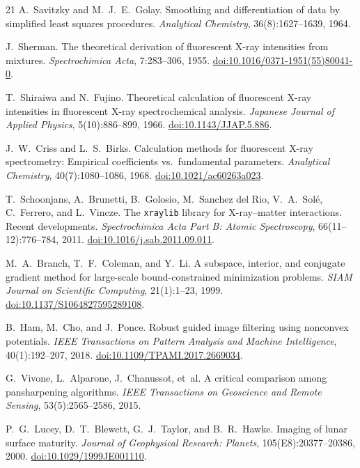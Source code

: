 \documentclass[journal,lettersize]{IEEEtran}
\providecommand{\doi}[1]{\href{https://doi.org/#1}{doi:#1}}
\begin{document}
\begin{thebibliography}{21}
A.~Savitzky and M.~J.~E.~Golay.
\newblock Smoothing and differentiation of data by simplified least
  squares procedures.
\newblock \emph{Analytical Chemistry}, 36(8):1627--1639, 1964.

J.~Sherman.
\newblock The theoretical derivation of fluorescent {X}-ray intensities
  from mixtures.
\newblock \emph{Spectrochimica Acta}, 7:283--306, 1955.
\newblock \doi{10.1016/0371-1951(55)80041-0}.

T.~Shiraiwa and N.~Fujino.
\newblock Theoretical calculation of fluorescent {X}-ray intensities in
  fluorescent {X}-ray spectrochemical analysis.
\newblock \emph{Japanese Journal of Applied Physics}, 5(10):886--899, 1966.
\newblock \doi{10.1143/JJAP.5.886}.

J.~W.~Criss and L.~S.~Birks.
\newblock Calculation methods for fluorescent {X}-ray spectrometry:
  Empirical coefficients vs.\ fundamental parameters.
\newblock \emph{Analytical Chemistry}, 40(7):1080--1086, 1968.
\newblock \doi{10.1021/ac60263a023}.

T.~Schoonjans, A.~Brunetti, B.~Golosio, M.~{Sanchez del Rio},
  V.~A.~Sol{\'e}, C.~Ferrero, and L.~Vincze.
\newblock The \texttt{xraylib} library for {X}-ray--matter interactions.
  {R}ecent developments.
\newblock \emph{Spectrochimica Acta Part B: Atomic Spectroscopy},
  66(11--12):776--784, 2011.
\newblock \doi{10.1016/j.sab.2011.09.011}.

M.~A.~Branch, T.~F.~Coleman, and Y.~Li.
\newblock A subspace, interior, and conjugate gradient method for
  large-scale bound-constrained minimization problems.
\newblock \emph{SIAM Journal on Scientific Computing}, 21(1):1--23, 1999.
\newblock \doi{10.1137/S1064827595289108}.

B.~Ham, M.~Cho, and J.~Ponce.
\newblock Robust guided image filtering using nonconvex potentials.
\newblock \emph{IEEE Transactions on Pattern Analysis and Machine
  Intelligence}, 40(1):192--207, 2018.
\newblock \doi{10.1109/TPAMI.2017.2669034}.

G.~Vivone, L.~Alparone, J.~Chanussot, et~al.
\newblock A critical comparison among pansharpening algorithms.
\newblock \emph{IEEE Transactions on Geoscience and Remote Sensing},
  53(5):2565--2586, 2015.

P.~G.~Lucey, D.~T.~Blewett, G.~J.~Taylor, and B.~R.~Hawke.
\newblock Imaging of lunar surface maturity.
\newblock \emph{Journal of Geophysical Research: Planets},
  105(E8):20377--20386, 2000.
\newblock \doi{10.1029/1999JE001110}.


\end{thebibliography}
\end{document}
